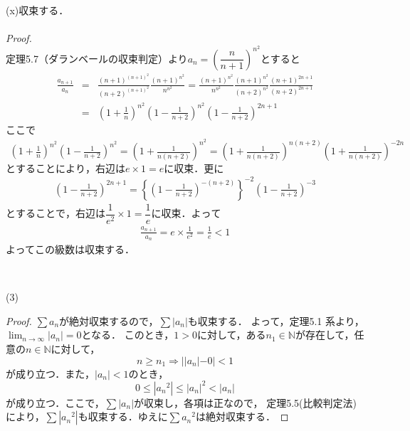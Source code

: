 \documentclass[dvipdfmx,uplatex,11pt]{jsarticle}
\theoremstyle{definition}
\begin{document}
	\begin{screen}
	(x)収束する．\\
	\dotfill \\
	{\it Proof.}\\
	定理5.7（ダランベールの収束判定）より$a_n=\left(\dfrac{n}{n+1}\right)^{n^2}$とすると
	\begin{eqnarray*}
	\frac{a_{n+1}}{a_n}&=&\frac{(n+1)^{(n+1)^2}}{(n+2)^{(n+1)^2}}\frac{(n+1)^{n^2}}{n^{n^2}}=\frac{(n+1)^{n^2}}{n^{n^2}}\frac{(n+1)^{n^2}}{(n+2)^{n^2}}\frac{(n+1)^{2n+1}}{(n+2)^{2n+1}}\\
	&=&\left(1+\frac{1}{n}\right)^{n^2}\left(1-\frac{1}{n+2}\right)^{n^2}\left(1-\frac{1}{n+2}\right)^{2n+1}
	\end{eqnarray*}
	ここで
	\begin{eqnarray*}
	\left(1+\frac{1}{n}\right)^{n^2}\left(1-\frac{1}{n+2}\right)^{n^2}=\left(1+\frac{1}{n(n+2)}\right)^{n^2}=\left(1+\frac{1}{n(n+2)}\right)^{n(n+2)}\left(1+\frac{1}{n(n+2)}\right)^{-2n}
	\end{eqnarray*}
	$とすることにより，右辺はe \times 1=eに収束．更に$
	\begin{eqnarray*}
	\left(1-\frac{1}{n+2}\right)^{2n+1}=\left\{\left(1-\frac{1}{n+2}\right)^{-(n+2)}\right\}^{-2}\left(1-\frac{1}{n+2}\right)^{-3}
	\end{eqnarray*}
	$とすることで，右辺は\dfrac{1}{e^2} \times 1=\dfrac{1}{e}に収束．よって$
	\begin{eqnarray*}
	\frac{a_{n+1}}{a_n}=e \times \frac{1}{e^2}=\frac{1}{e}<1
	\end{eqnarray*}
	よってこの級数は収束する．
\end{screen}

​\newpage

(3)
\begin{leftbar}
	\begin{proof}
		$\sum a_n $が絶対収束するので，$\sum |a_n|$も収束する．
		よって，定理5.1 系より，$\lim_{n \to \infty} |a_n| =0$となる．
		このとき，$1>0$に対して，ある$n_1 \in \mathbb{N}$が存在して，任意の$n \in \mathbb{N}$に対して，
		\[
			n \ge n_1 \Longrightarrow ||a_n| -0|<1
		\]
		が成り立つ．また，$|a_n|<1$のとき，
		\[
			0 \le |{a_n}^2| \le {|a_n|}^2 < |a_n|
		\]
		が成り立つ．ここで，$\sum |a_n|$が収束し，各項は正なので， 定理5.5(比較判定法)により，$\sum |{a_n}^2|$も収束する．ゆえに$\sum {a_n}^2$は絶対収束する．
	\end{proof}
\end{leftbar}

\newpage
\end{document}
